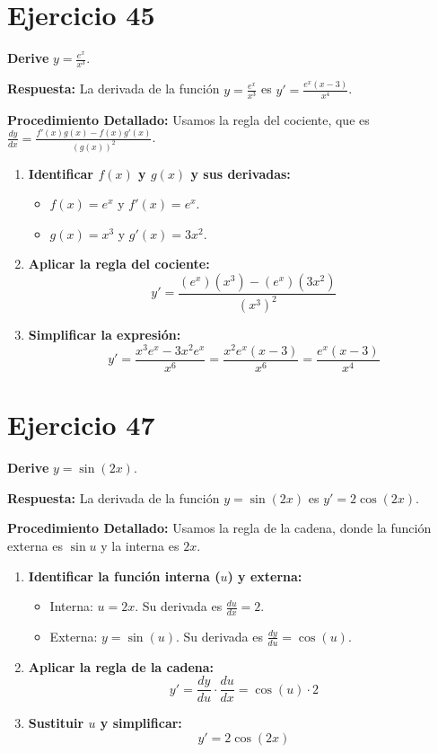 \documentclass[12pt, a4paper]{article}
\begin{document}
\section{Ejercicio 45}
\textbf{Derive} $y=\frac{e^x}{x^3}$.

\textbf{Respuesta:}
La derivada de la función $y=\frac{e^x}{x^3}$ es $y'=\frac{e^x(x-3)}{x^4}$.

\textbf{Procedimiento Detallado:}
Usamos la regla del cociente, que es $\frac{dy}{dx}=\frac{f'(x)g(x)-f(x)g'(x)}{(g(x))^2}$.
\begin{enumerate}
    \item \textbf{Identificar $f(x)$ y $g(x)$ y sus derivadas:}
    \begin{itemize}
        \item $f(x)=e^x$ y $f'(x)=e^x$.
        \item $g(x)=x^3$ y $g'(x)=3x^2$.
    \end{itemize}
    \item \textbf{Aplicar la regla del cociente:}
    \[y'=\frac{(e^x)(x^3)-(e^x)(3x^2)}{(x^3)^2}\]
    \item \textbf{Simplificar la expresión:}
    \[y'=\frac{x^3e^x-3x^2e^x}{x^6}=\frac{x^2e^x(x-3)}{x^6}=\frac{e^x(x-3)}{x^4}\]
\end{enumerate}

\section{Ejercicio 47}
\textbf{Derive} $y=\sin(2x)$.

\textbf{Respuesta:}
La derivada de la función $y=\sin(2x)$ es $y'=2\cos(2x)$.

\textbf{Procedimiento Detallado:}
Usamos la regla de la cadena, donde la función externa es $\sin u$ y la interna es $2x$.
\begin{enumerate}
    \item \textbf{Identificar la función interna ($u$) y externa:}
    \begin{itemize}
        \item Interna: $u=2x$. Su derivada es $\frac{du}{dx}=2$.
        \item Externa: $y=\sin(u)$. Su derivada es $\frac{dy}{du}=\cos(u)$.
    \end{itemize}
    \item \textbf{Aplicar la regla de la cadena:}
    \[y'=\frac{dy}{du}\cdot\frac{du}{dx}=\cos(u)\cdot 2\]
    \item \textbf{Sustituir $u$ y simplificar:}
    \[y'=2\cos(2x)\]
\end{enumerate}
\end{document}
